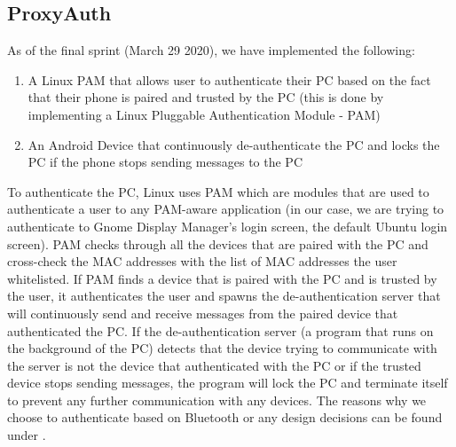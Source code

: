 \documentclass[letterpaper,twocolumn,10pt]{article}
\begin{document}
\subsection{ProxyAuth}
As of the final sprint (March 29 2020), we have implemented the following:
\begin{enumerate}[noitemsep]
\item A Linux PAM that allows user to authenticate their PC based on the fact that their phone is paired and trusted by the PC (this is done by implementing a Linux Pluggable Authentication Module - PAM)
\item An Android Device that continuously de-authenticate the PC and locks the PC if the phone stops sending messages to the PC
\end{enumerate}

To authenticate the PC, Linux uses PAM which are modules that are used to authenticate a user to any PAM-aware application (in our case, we are trying to authenticate to Gnome Display Manager's login screen, the default Ubuntu login screen). PAM checks through all the devices that are paired with the PC and cross-check the MAC addresses with the list of MAC addresses the user whitelisted. If PAM finds a device that is paired with the PC and is trusted by the user, it authenticates the user and spawns the de-authentication server that will continuously send and receive messages from the paired device that authenticated the PC. If the de-authentication server (a program that runs on the background of the PC) detects that the device trying to communicate with the server is not the device that authenticated with the PC or if the trusted device stops sending messages, the program will lock the PC and terminate itself to prevent any further communication with any devices. The reasons why we choose to authenticate based on Bluetooth or any design decisions can be found under .
\end{document}
